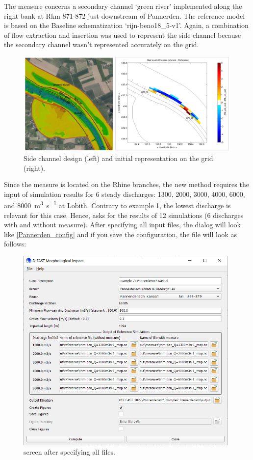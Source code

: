 The measure concerns a secondary channel `green river' implemented along the right bank at Rkm 871-872 just downstream of Pannerden.
The reference model is based on the Baseline schematization ‘rijn-beno18\_5-v1’.
Again, a combination of flow extraction and insertion was used to represent the side channel because the secondary channel wasn't represented accurately on the grid.

\begin{figure}
\includegraphics[width=\columnwidth]{figures/Pannerden_proj.png}
\caption{Side channel design (left) and initial representation on the grid (right).}
\label{Pannerden_proj}
\end{figure}

Since the measure is located on the Rhine branches, the new \dfastmi method requires the input of simulation results for 6 steady discharges: 1300, 2000, 3000, 4000, 6000, and \SI{8000}{\metre\cubed\per\second} at Lobith.
Contrary to example 1, the lowest discharge is relevant for this case.
Hence, \dfmi asks for the results of 12 simulations (6 discharges with and without measure).
After specifying all input files, the dialog will look like \autoref{Pannerden_config} and if you save the configuration, the file will look as follows:

\begin{figure}
\center
\includegraphics[width=11cm]{figures/Pannerden_config.png}
\caption{\dfmi screen after specifying all files.}
\label{Pannerden_config}
\end{figure}

